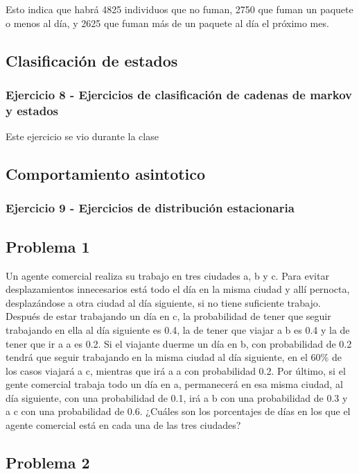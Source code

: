 \documentclass{article}
\begin{document}
Esto indica que habrá 4825 individuos que no fuman, 2750 que fuman un paquete o menos al día, y 2625 que fuman más de un paquete al día el próximo mes.

\subsection{Clasificación de estados}

\subsubsection{Ejercicio 8 - Ejercicios de clasificación de cadenas  de markov y estados}

Este ejercicio se vio durante la clase

\subsection{Comportamiento asintotico}

\subsubsection{Ejercicio 9 - Ejercicios de distribución estacionaria}

\subsection*{Problema 1}

Un agente comercial realiza su trabajo en tres ciudades a, b y c. Para evitar desplazamientos innecesarios está todo el día en la misma ciudad y allí pernocta, desplazándose a otra ciudad al día siguiente, si no tiene suficiente trabajo. Después de estar trabajando un día en c, la probabilidad de tener que seguir trabajando en ella al día siguiente es 0.4, la de tener que viajar a b es 0.4 y la de tener que ir a a es 0.2. Si el viajante duerme un día en b, con probabilidad de 0.2 tendrá que seguir trabajando en la misma ciudad al día siguiente, en el 60\% de los casos viajará a c, mientras que irá a a con probabilidad 0.2. Por último, si el gente comercial trabaja todo un día en a, permanecerá en esa misma ciudad, al día siguiente, con una probabilidad de 0.1, irá a b con una probabilidad de 0.3 y a c con una probabilidad de 0.6. ¿Cuáles son los porcentajes de días en los que el agente comercial está en cada una de las tres ciudades?

\subsection*{Problema 2}
\end{document}
